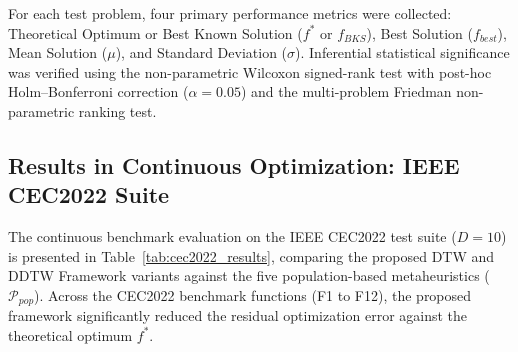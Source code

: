 For each test problem, four primary performance metrics were collected: Theoretical Optimum or Best Known Solution ($f^*$ or $f_{BKS}$), Best Solution ($f_{best}$), Mean Solution ($\mu$), and Standard Deviation ($\sigma$). Inferential statistical significance was verified using the non-parametric Wilcoxon signed-rank test with post-hoc Holm--Bonferroni correction ($\alpha = 0.05$) and the multi-problem Friedman non-parametric ranking test.

\subsection{Results in Continuous Optimization: IEEE CEC2022 Suite}
\label{sec:results_cec2022}

The continuous benchmark evaluation on the IEEE CEC2022 test suite ($D=10$) is presented in Table~\ref{tab:cec2022_results}, comparing the proposed DTW and DDTW Framework variants against the five population-based metaheuristics ($\mathcal{P}_{pop}$). Across the CEC2022 benchmark functions (F1 to F12), the proposed framework significantly reduced the residual optimization error against the theoretical optimum $f^*$.

